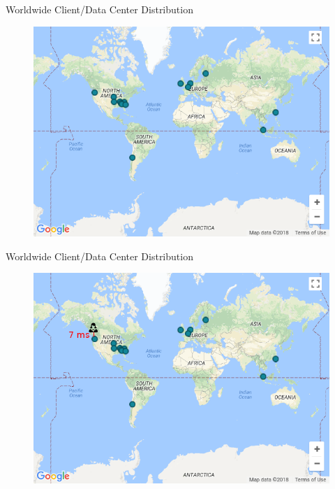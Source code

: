 \documentclass[10pt]{beamer}
\begin{document}
\begin{frame}{Worldwide Client/Data Center Distribution}
    \begin{figure}
        \center
        \includegraphics[scale=0.45]{apollo_google_dc}
    \end{figure}
\end{frame}

\begin{frame}{Worldwide Client/Data Center Distribution}
    \begin{figure}
        \center
        \includegraphics[scale=0.45]{apollo_google_vancouver}
    \end{figure}
\end{frame}
\end{document}
